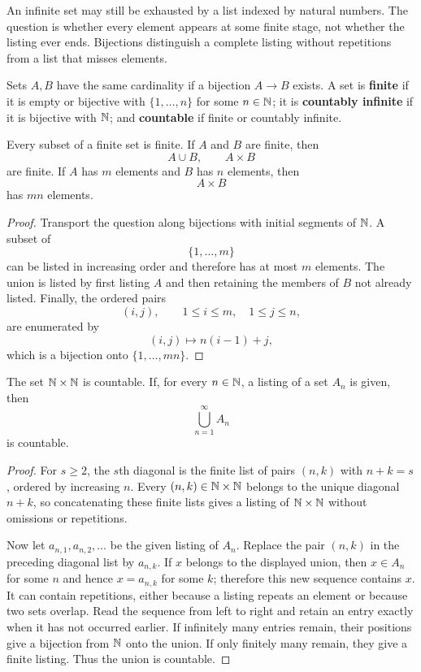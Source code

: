 An infinite set may still be exhausted by a list indexed by natural numbers.
The question is whether every element appears at some finite stage, not
whether the listing ever ends. Bijections distinguish a complete listing
without repetitions from a list that misses elements.


\begin{definition}[Countability]
Sets $A,B$ have the same cardinality if a bijection $A\to B$ exists. A set is \textbf{finite} if it is empty or bijective with $\{1,\ldots,n\}$ for some $n\in\mathbb{N}$; it is \textbf{countably infinite} if it is bijective with $\mathbb{N}$; and \textbf{countable} if finite or countably infinite.
\end{definition}

\begin{proposition}
\label{prop:finite-set-facts}
Every subset of a finite set is finite. If $A$ and $B$ are finite, then
\[
A\cup B,\qquad A\times B
\]
are finite. If $A$ has $m$ elements and $B$ has $n$ elements, then
\[
A\times B
\]
has $mn$ elements.
\end{proposition}
\begin{proof}
Transport the question along bijections with initial segments of $\mathbb{N}$. A subset of
\[
\{1,\ldots,m\}
\]
can be listed in increasing order and therefore has at most $m$ elements. The union is listed by first listing $A$ and then retaining the members of $B$ not already listed. Finally, the ordered pairs
\[
(i,j),
\qquad
1\leq i\leq m,\quad1\leq j\leq n,
\]
are enumerated by
\[
(i,j)\longmapsto n(i-1)+j,
\]
which is a bijection onto $\{1,\ldots,mn\}$.
\end{proof}

\begin{theorem}
\label{thm:diagonal-enumeration}
The set $\mathbb{N}\times\mathbb{N}$ is countable. If, for every $n\in\mathbb{N}$, a listing of a set $A_n$ is given, then
\[
\bigcup_{n=1}^{\infty}A_n
\]
is countable.
\end{theorem}
\begin{proof}
For $s\geq2$, the $s$th diagonal is the finite list of pairs $(n,k)$ with $n+k=s$, ordered by increasing $n$. Every $(n,k)\in\mathbb{N}\times\mathbb{N}$ belongs to the unique diagonal $n+k$, so concatenating these finite lists gives a listing of $\mathbb{N}\times\mathbb{N}$ without omissions or repetitions.

Now let $a_{n,1},a_{n,2},\ldots$ be the given listing of $A_n$. Replace the pair $(n,k)$ in the preceding diagonal list by $a_{n,k}$. If $x$ belongs to the displayed union, then $x\in A_n$ for some $n$ and hence $x=a_{n,k}$ for some $k$; therefore this new sequence contains $x$. It can contain repetitions, either because a listing repeats an element or because two sets overlap. Read the sequence from left to right and retain an entry exactly when it has not occurred earlier. If infinitely many entries remain, their positions give a bijection from $\mathbb{N}$ onto the union. If only finitely many remain, they give a finite listing. Thus the union is countable.
\end{proof}

